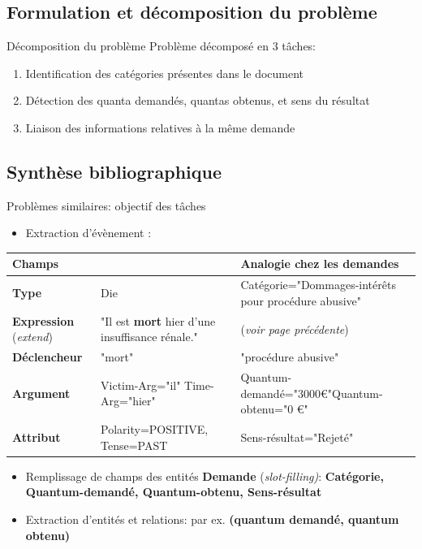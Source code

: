 \documentclass[newPxFont,pagenumber]{beamer}
\begin{document}
\subsection{Formulation et décomposition du problème}

\begin{frame}{Décomposition du problème}
Problème décomposé en 3 tâches:
\begin{enumerate}
\item Identification des catégories présentes dans le document
\item Détection des quanta demandés, quantas obtenus, et sens du résultat
\item Liaison des informations relatives à la même demande
\end{enumerate}
\end{frame}

\subsection{Synthèse bibliographique}
\begin{frame}{Problèmes similaires: objectif des tâches}
\begin{itemize}
\item Extraction d'évènement : 
\end{itemize}
\begin{table}
\scriptsize
\begin{tabular}{|p{}|p{}|p{}|}
\hline
\textbf{Champs} & \textbf{\cite{ace2005event}} & \textbf{Analogie chez les demandes} \\ \hline
\textbf{Type} &  Die & Catégorie="Dommages-intérêts pour procédure abusive" \\ \hline
\textbf{Expression} (\textit{extend}) & "Il est \textbf{mort} hier d'une insuffisance rénale."  & (\textit{voir page précédente}) \\ \hline
\textbf{Déclencheur} & "mort" & "procédure abusive"\\ \hline
\textbf{Argument} & Victim-Arg="il" \linebreak Time-Arg="hier"  & Quantum-demandé="3000€"\linebreak  Quantum-obtenu="0 €"\ \\ \hline
\textbf{Attribut} & Polarity=POSITIVE, Tense=PAST & Sens-résultat="Rejeté" \\ \hline
\end{tabular}
\end{table}
\begin{itemize}
\item Remplissage de champs des entités \textbf{Demande} (\textit{slot-filling)}: \textbf{Catégorie, Quantum-demandé, Quantum-obtenu, Sens-résultat}
\item Extraction d'entités et relations: par ex. \textbf{(quantum demandé, quantum obtenu)}
\end{itemize}
\end{frame}
\end{document}
